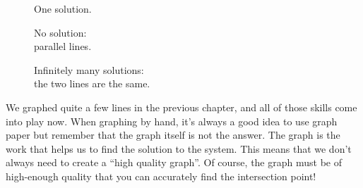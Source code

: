 \begin{figure}
\begin{minipage}[t]{\textwidth/3}
\centering


One solution.
\end{minipage}%
%
\begin{minipage}[t]{\textwidth/3}
\centering


No solution:\\parallel lines.
\end{minipage}%
%
\begin{minipage}[t]{\textwidth/3}
\centering


Infinitely many solutions:\\the two lines are the same.
\end{minipage}
\end{figure}

We graphed quite a few lines in the previous chapter, and all of those skills come into play now. When graphing by hand, it's always a good idea to use graph paper but remember that the graph itself is not the answer. The graph is the work that helps us to find the solution to the system. This means that we don't always need to create a ``high quality graph''. Of course, the graph must be of high-enough quality that you can accurately find the intersection point!

